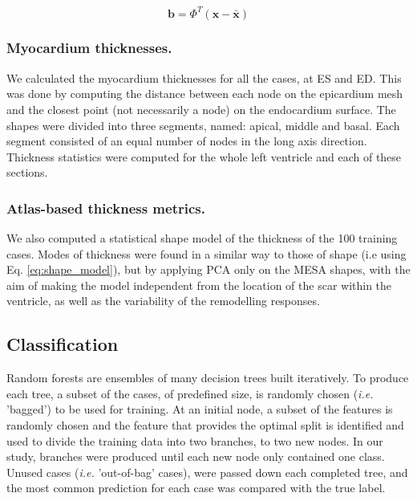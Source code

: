 \documentclass{llncs}
\begin{document}
\begin{equation} \label{eq:shape_model}
\textbf{b} = \Phi^T(\textbf{x} - \bar{\textbf{x}} )
\end{equation}

\subsubsection{Myocardium thicknesses.}
We calculated the myocardium thicknesses for all the cases, at ES and ED. This was done by computing the distance between each node on the epicardium mesh and the closest point (not necessarily a node) on the endocardium surface. The shapes were divided into three segments, named: apical, middle and basal. Each segment consisted of an equal number of nodes in the long axis direction. Thickness statistics were computed for the whole left ventricle and each of these sections.
\subsubsection{Atlas-based thickness metrics.} 

We also computed a statistical shape model of the thickness of the 100 training cases. Modes of thickness were found in a similar way to those of shape (i.e using Eq. \ref{eq:shape_model}), but by applying PCA only on the MESA shapes, with the aim of making the model independent from the location of the scar within the ventricle, as well as the variability of the remodelling responses.

	
	\subsection{Classification}

\label{method:classification}

 

Random forests are ensembles of many decision trees built iteratively. To produce each tree, a subset of the cases, of predefined size, is randomly chosen (\emph{i.e.} 'bagged') to be used for training. At an initial node, a subset of the features is randomly chosen and the feature that provides the optimal split is identified and used to divide the training data into two branches, to two new nodes. In our study, branches were produced until each new node only contained one class. Unused cases (\emph{i.e.} 'out-of-bag' cases), were passed down each completed tree, and the most common prediction for each case was compared with the true label.
\end{document}
